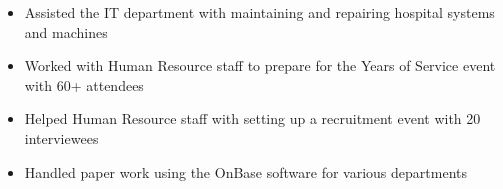\documentclass[10pt,letter]{altacv}
\begin{document}


\smallskip






\begin{itemize}
  \item Assisted the IT department with maintaining and repairing hospital systems and machines
  \item Worked with Human Resource staff to prepare for the Years of Service event with 60+ attendees
  \item Helped Human Resource staff with setting up a recruitment event with 20 interviewees
  \item Handled paper work using the OnBase software for various departments 
\end{itemize}
\end{document}
